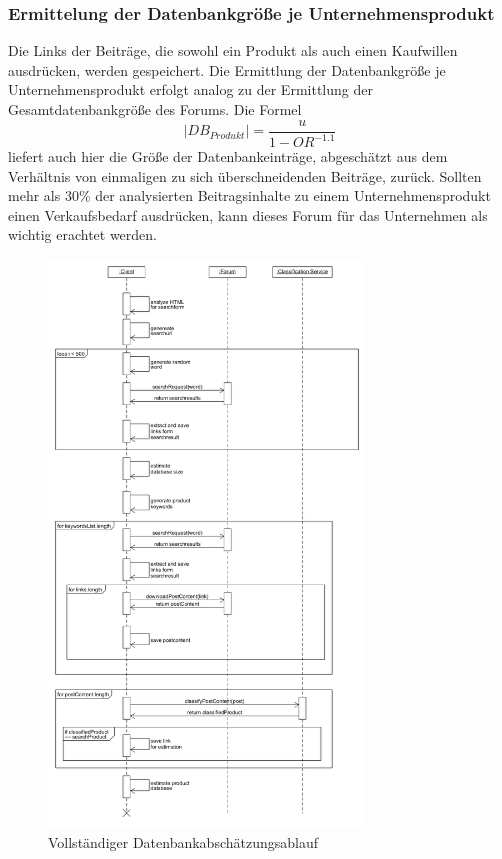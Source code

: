 \subsubsection{Ermittelung der Datenbankgröße je Unternehmensprodukt}
Die Links der Beiträge, die sowohl ein Produkt als auch einen Kaufwillen ausdrücken, werden gespeichert. Die Ermittlung der Datenbankgröße je Unternehmensprodukt erfolgt analog zu der Ermittlung der Gesamtdatenbankgröße des Forums. Die Formel \[|DB_{Produkt}| = \frac{u}{1-OR^{-1.1}}\] \cite{lu2008efficient} liefert auch hier die Größe der Datenbankeinträge, abgeschätzt aus dem Verhältnis von einmaligen zu sich überschneidenden Beiträge, zurück.
Sollten mehr als 30\% der analysierten Beitragsinhalte zu einem Unternehmensprodukt einen Verkaufsbedarf ausdrücken, kann dieses Forum für das Unternehmen als wichtig erachtet werden.

\newpage


\begin{figure}[h!]
\centering
		\includegraphics[width=0.75\textwidth,height=\textheight,keepaspectratio]{./diagrams/estimate_seq.png}
		\caption{Vollständiger Datenbankabschätzungsablauf}
	\end{figure}
	
	
\newpage

